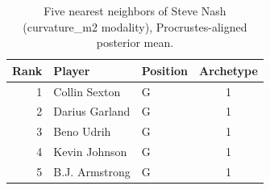 \begin{table}[htbp]
  \centering\small
  \begin{tabular}{rllc}
    \toprule
    Rank & Player & Position & Archetype \\
    \midrule
    1 & Collin Sexton & G & 1 \\
    2 & Darius Garland & G & 1 \\
    3 & Beno Udrih & G & 1 \\
    4 & Kevin Johnson & G & 1 \\
    5 & B.J. Armstrong & G & 1 \\
    \bottomrule
  \end{tabular}
  \caption{Five nearest neighbors of Steve Nash (curvature_m2 modality), Procrustes-aligned posterior mean.}
  \label{tab:Steve_Nash_neighbors_curvature_m2}
\end{table}

